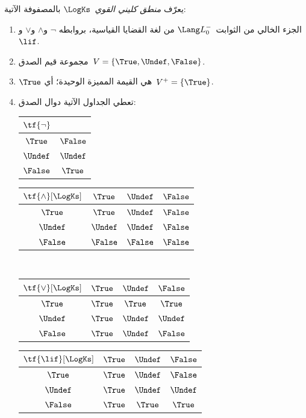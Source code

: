 \documentclass[../../../include/open-logic-section]{subfiles}
\begin{document}
\begin{defn}
يعرّف \emph{منطق كليني القوي}~$\LogKs$ بالمصفوفة الآتية:
\begin{enumerate}
  \item الجزء الخالي من الثوابت~$\Lang L_0^{-}$ من لغة القضايا القياسية، بروابطه
  $\lnot$ و$\land$ و$\lor$ و$\lif$.
  \item مجموعة قيم الصدق~$V = \{\True, \Undef, \False\}$.
  \item $\True$ هي القيمة المميزة الوحيدة؛ أي~$V^+ = \{\True\}$.
  \item تعطي الجداول الآتية دوال الصدق:
  \begin{center}
    \begin{tabular}{c|c}
      $\tf{\lnot}$ & \\
      \hline
      $\True$ & $\False$ \\
      $\Undef$ & $\Undef$ \\
      $\False$ & $\True$
    \end{tabular}
    \quad
    \begin{tabular}{c|ccc}
      $\tf{\land}[\LogKs]$ & $\True$ & $\Undef$ & $\False$ \\
      \hline
      $\True$ & $\True$ & $\Undef$ & $\False$ \\
      $\Undef$ & $\Undef$ & $\Undef$ & $\False$\\
      $\False$ & $\False$ & $\False$ & $\False$
    \end{tabular}
    \\[2ex]
    \begin{tabular}{c|ccc}
      $\tf{\lor}[\LogKs]$ & $\True$ & $\Undef$ & $\False$ \\
      \hline
      $\True$ & $\True$ & $\True$ & $\True$ \\
      $\Undef$ & $\True$ & $\Undef$ & $\Undef$ \\
      $\False$ & $\True$ & $\Undef$ & $\False$
    \end{tabular}
    \quad
    \begin{tabular}{c|ccc}
      $\tf{\lif}[\LogKs]$ & $\True$ & $\Undef$ & $\False$ \\
      \hline
      $\True$ & $\True$ & $\Undef$ & $\False$ \\
      $\Undef$ & $\True$ & $\Undef$ & $\Undef$  \\
      $\False$ & $\True$ & $\True$ & $\True$
    \end{tabular}
  \end{center}
\end{enumerate}
\end{defn}
\end{document}
